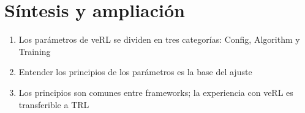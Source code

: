 \section{Síntesis y ampliación}
\begin{enumerate}
  \item Los parámetros de veRL se dividen en tres categorías: Config, Algorithm y Training
  \item Entender los principios de los parámetros es la base del ajuste
  \item Los principios son comunes entre frameworks; la experiencia con veRL es transferible a TRL
\end{enumerate}

